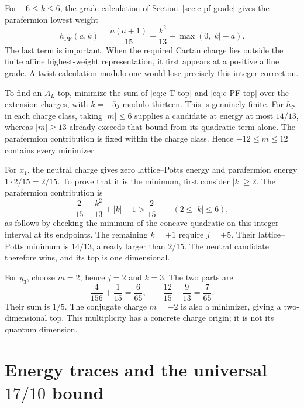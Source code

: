 For $-6\leq k\leq6$, the grade calculation of
Section~\ref{sec:c-pf-grade} gives the parafermion lowest weight
\begin{equation}\label{eq:c-PF-top}
 h_{\mathrm{PF}}(a,k)=\frac{a(a+1)}{15}-\frac{k^2}{13}
                                      +\max(0,|k|-a).
\end{equation}
The last term is important. When the required Cartan charge lies
outside the finite affine highest-weight representation, it first
appears at a positive affine grade. A twist calculation modulo one
would lose precisely this integer correction.

To find an $A_L$ top, minimize the sum of
\eqref{eq:c-T-top} and \eqref{eq:c-PF-top} over the extension
charges, with $k=-5j$ modulo thirteen. This is genuinely finite.
For $h_{\mathcal T}$ in each charge class, taking $|m|\leq6$
supplies a candidate at energy at most $14/13$, whereas
$|m|\geq13$ already exceeds that bound from its quadratic term
alone. The parafermion contribution is fixed within the charge
class. Hence $-12\leq m\leq12$ contains every minimizer.

\begin{example}
For $x_1$, the neutral charge gives zero lattice--Potts energy and
parafermion energy $1\cdot2/15=2/15$. To prove that it is the
minimum, first consider $|k|\geq2$. The parafermion contribution is
\[
 \frac2{15}-\frac{k^2}{13}+|k|-1>\frac2{15}
 \qquad(2\leq |k|\leq6),
\]
as follows by checking the minimum of the concave quadratic on this
integer interval at its endpoints. The remaining $k=\pm1$ require
$j=\pm5$. Their lattice--Potts minimum is $14/13$, already larger
than $2/15$. The neutral candidate therefore wins, and its top is
one dimensional.

For $y_3$, choose $m=2$, hence $j=2$ and $k=3$. The two parts are
\[
 \frac4{156}+\frac1{15}=\frac6{65},\qquad
 \frac{12}{15}-\frac9{13}=\frac7{65}.
\]
Their sum is $1/5$. The conjugate charge $m=-2$ is also a minimizer,
giving a two-dimensional top. This multiplicity has a concrete charge
origin; it is not its quantum dimension.
\end{example}

\section{\texorpdfstring{Energy traces and the universal $17/10$ bound}{Energy traces and the universal 17/10 bound}}

